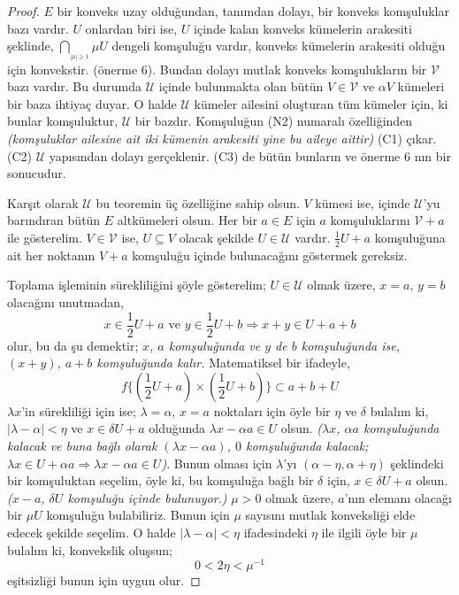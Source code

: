 \documentclass[11pt]{article}
\theoremstyle{plain}
\theoremstyle{definition}
\theoremstyle{remark}
\numberwithin{equation}{section}
\renewcommand{\%}{{\small \%}}
\begin{document}
\begin{proof}
$E$ bir konveks uzay olduğundan, tanımdan dolayı, bir konveks komşuluklar bazı vardır. $U$ onlardan biri ise, $U$ içinde kalan konveks kümelerin arakesiti şeklinde, $\underset{_{|\mu|\geq 1}}\bigcap\mu U$ dengeli komşuluğu vardır, konveks kümelerin arakesiti olduğu için konvekstir. (önerme 6). Bundan dolayı mutlak konveks komşulukların bir $\mathscr{V}$ bazı vardır. Bu durumda $\mathscr{U}$ içinde bulunmakta olan bütün $V\in\mathscr{V}$ ve $\alpha V$ kümeleri bir baza ihtiyaç duyar. O halde $\mathscr{U}$ kümeler ailesini oluşturan tüm kümeler için, ki bunlar komşuluktur, $\mathscr{U}$ bir bazdır. Komşuluğun (N2) numaralı özelliğinden \emph{(komşuluklar ailesine ait iki kümenin arakesiti yine bu aileye aittir)} (C1) çıkar. (C2) $\mathscr{U}$ yapısından dolayı gerçeklenir. (C3) de bütün bunların  ve önerme 6 nın bir sonucudur.

Karşıt olarak $\mathscr{U}$ bu teoremin üç özelliğine sahip olsun. $V$ kümesi ise, içinde $\mathscr{U}$'yu barındıran bütün $E$ altkümeleri olsun. Her bir $a\in E$ için $a$ komşuluklarını $\mathscr{V}+a$ ile gösterelim. $V\in \mathscr{V}$ ise, $U\subseteq V$ olacak şekilde $U\in\mathscr{U}$ vardır. $\frac{1}{2}U+a$ komşuluğuna ait her noktanın $V+a$ komşuluğu içinde bulunacağını göstermek gereksiz. 

Toplama işleminin sürekliliğini şöyle gösterelim; $U\in\mathscr{U}$ olmak üzere, $x=a$, $y=b$ olacağını unutmadan, \[x\in\frac{1}{2}U+a \text{ ve } y\in\frac{1}{2}U+b\Rightarrow x+y\in U+a+b\]olur, bu da şu demektir; \emph{$x$, $a$ komşuluğunda ve $y$ de $b$ komşuluğunda ise, $(x+y)$, $a+b$ komşuluğunda kalır.} Matematiksel bir ifadeyle, 
\[
f\Bigg\{\left(\dfrac{1}{2}U+a\right)\times\left(\dfrac{1}{2}U+b\right)\Bigg\}\subset a+b+U
\]
\newpage
$\lambda x$'in sürekliliği için ise; $\lambda=\alpha$, $x=a$ noktaları için öyle bir $\eta$ ve $\delta$ bulalım ki, $|\lambda-\alpha|<\eta$ ve $x\in\delta U+a$ olduğunda $\lambda x-\alpha a\in U$ olsun. \emph{($\lambda x$, $\alpha a$ komşuluğunda kalacak ve buna bağlı olarak $(\lambda x-\alpha a)$, $0$ komşuluğunda kalacak; $\lambda x\in U+\alpha a\Rightarrow\lambda x-\alpha a\in U$)}. Bunun olması için $\lambda$'yı $\left(\alpha -\eta,\alpha+\eta\right)$ şeklindeki bir komşuluktan seçelim, öyle ki, bu komşuluğa bağlı bir $\delta$ için, $x\in\delta U+a$ olsun. \emph{($x-a$, $\delta U$ komşuluğu içinde bulunuyor.)} 
$\mu>0$ olmak üzere, $a$'nın elemanı olacağı bir $\mu U$ komşuluğu bulabiliriz. Bunun için $\mu$ sayısını mutlak konveksliği elde edecek şekilde seçelim. O halde $|\lambda-\alpha|<\eta$ ifadesindeki $\eta$ ile ilgili öyle bir $\mu$ bulalım ki, konvekslik oluşsun;\[0<2\eta<\mu^{-1}\] eşitsizliği bunun için uygun olur.


\end{proof}
\end{document}
